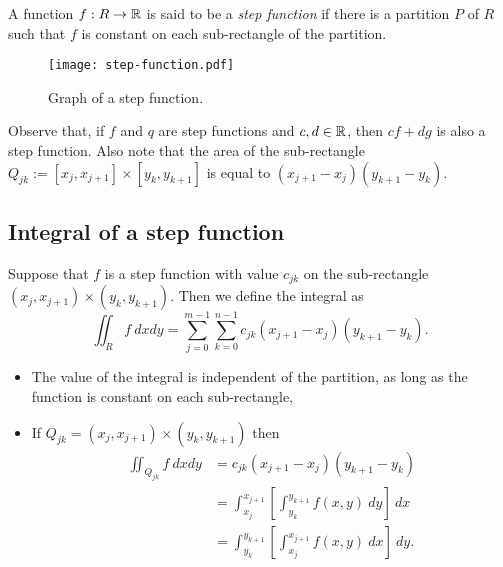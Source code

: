 \begin{definition}
    A function \(f:R\to \mathbb{R} \) is said to be a \emph{step function} if there is a partition \(P\) of \(R\) such that \(f\) is constant on each sub-rectangle of the partition.
\end{definition}

\begin{figure}
    \centering
    \texttt{[image: step-function.pdf]}
    \caption{Graph of a step function.}
\end{figure}

Observe that, if \(f\) and \(q\) are step functions and  \(c,d \in \mathbb{R}\), then \(c f + d g\) is also a step function.
Also note that the area of the sub-rectangle \(Q_{jk}:=[x_{j},x_{j+1}]\times [y_{k},y_{k+1}]\) is equal to \( (x_{j+1}-x_{j})(y_{k+1}-y_{k})\).

\subsection{Integral of a step function}

\begin{definition}
    Suppose that \(f\) is a step function with value \(c_{jk}\) on the sub-rectangle \((x_{j},x_{j+1})\times (y_{k},y_{k+1})\).
    Then we define the integral as
    \[
        \iint_{R} f \ dxdy = \sum_{j=0}^{m-1} \sum_{k=0}^{n-1} c_{jk} (x_{j+1}-x_{j})(y_{k+1}-y_{k}).
    \]
\end{definition}

\begin{itemize}
    \item The value of the integral is independent of the partition, as long as the function is constant on each sub-rectangle,
    \item If \(Q_{jk} = (x_{j},x_{j+1})\times (y_{k},y_{k+1})\) then
          \[
              \begin{aligned}
                  \iint_{Q_{jk}} f \ dxdy
                   & = c_{jk} (x_{j+1}-x_{j})(y_{k+1}-y_{k})                                       \\
                   & = \int_{x_j}^{x_{j+1}} \left[\int_{y_k}^{y_{k+1}}f(x,y) \ dy\right] \ dx      \\
                   & =  \int_{y_k}^{y_{k+1}} \left[ \int_{x_j}^{x_{j+1}} f(x,y) \ dx \right] \ dy.
              \end{aligned}
          \]
\end{itemize}




